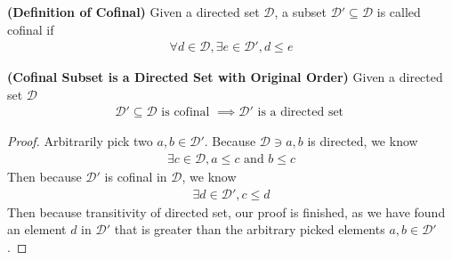 \documentclass{report}
\begin{document}
\begin{definition}
\label{1.1.9}
\textbf{(Definition of Cofinal)} Given a directed set $\mathcal{D}$, a subset $\mathcal{D}'\subseteq \mathcal{D}$ is called cofinal if 
\begin{align*}
\forall d \in \mathcal{D},\exists e\in \mathcal{D}', d\leq e 
\end{align*}
\end{definition}
\begin{theorem}
\label{1.1.10}
\textbf{(Cofinal Subset is a Directed Set with Original Order)} Given a directed set $\mathcal{D}$
 \begin{align*}
 \mathcal{D}'\subseteq \mathcal{D}\text{ is cofinal }\implies \mathcal{D}'\text{ is a directed set }
 \end{align*}
\end{theorem}
\begin{proof}
Arbitrarily pick two $a,b \in \mathcal{D}'$. Because $\mathcal{D}\ni a,b$ is directed, we know 
\begin{align*}
\exists c \in \mathcal{D}, a\leq c \text{ and } b\leq c
\end{align*}
Then because $\mathcal{D}'$ is cofinal in $\mathcal{D}$, we know 
\begin{align*}
\exists d \in \mathcal{D}', c\leq d
\end{align*}
Then because transitivity of directed set, our proof is finished, as we have found an element $d$ in $\mathcal{D}'$ that is greater than the arbitrary picked elements $a,b \in \mathcal{D}'$. 
\end{proof}
\end{document}
